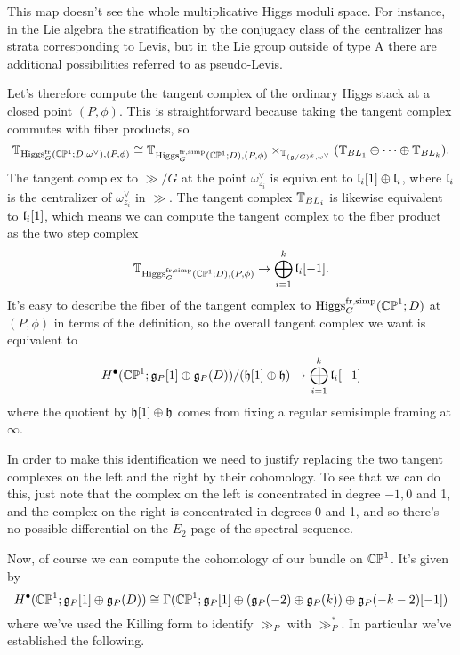 \documentclass[10pt, oneside]{article}
\begin{document}
\begin{remark}
This map doesn't see the whole multiplicative Higgs moduli space.  For instance, in the Lie algebra the stratification by the conjugacy class of the centralizer has strata corresponding to Levis, but in the Lie group outside of type A there are additional possibilities referred to as pseudo-Levis.  
\end{remark}

Let's therefore compute the tangent complex of the ordinary Higgs stack at a closed point $(P,\phi)$.  This is straightforward because taking the tangent complex commutes with fiber products, so
\[\mathbb{T}_{\mathrm{Higgs}_G^{\mathrm{fr}}(\mathbb{CP}^1; D, \omega^\vee),(P,\phi)} \cong \mathbb{T}_{\mathrm{Higgs}_G^\text{fr,simp}(\mathbb{CP}^1; D),(P,\phi)} \times_{\mathbb{T}_{(\mathfrak{g}/G)^k, \omega^\vee}} (\mathbb{T}_{BL_1} \oplus \cdots \oplus \mathbb{T}_{BL_k}).\]
The tangent complex to $\gg/G$ at the point $\omega^\vee_{z_i}$ is equivalent to $\mathfrak{l}_i[1] \oplus \mathfrak{l}_i$, where $\mathfrak{l}_i$ is the centralizer of $\omega^\vee_{z_i}$ in $\gg$.  The tangent complex $\mathbb{T}_{BL_i}$ is likewise equivalent to $\mathfrak{l}_i[1]$, which means we can compute the tangent complex to the fiber product as the two step complex
\[\mathbb{T}_{\mathrm{Higgs}_G^\text{fr,simp}(\mathbb{CP}^1; D),(P,\phi)} \to \bigoplus_{i=1}^k \mathfrak{l}_i[-1].\]
It's easy to describe the fiber of the tangent complex to $\mathrm{Higgs}_G^\text{fr,simp}(\mathbb{CP}^1; D)$ at $(P,\phi)$ in terms of the definition, so the overall tangent complex we want is equivalent to
\[H^\bullet(\mathbb{CP}^1; \mathfrak{g}_P[1] \oplus \mathfrak{g}_P(D))/(\mathfrak{h}[1] \oplus \mathfrak{h}) \to \bigoplus_{i=1}^k \mathfrak{l}_i[-1]\]
where the quotient by $\mathfrak{h}[1] \oplus \mathfrak{h}$ comes from fixing a regular semisimple framing at $\infty$.

\begin{remark}
In order to make this identification we need to justify replacing the two tangent complexes on the left and the right by their cohomology.  To see that we can do this, just note that the complex on the left is concentrated in degree $-1,0$ and 1, and the complex on the right is concentrated in degrees 0 and 1, and so there's no possible differential on the $E_2$-page of the spectral sequence.
\end{remark}

Now, of course we can compute the cohomology of our bundle on $\mathbb{CP}^1$.  It's given by 
\[H^\bullet(\mathbb{CP}^1; \mathfrak{g}_P[1] \oplus \mathfrak{g}_P(D)) \cong \Gamma(\mathbb{CP}^1; \mathfrak{g}_P[1] \oplus (\mathfrak{g}_P(-2) \oplus \mathfrak{g}_P(k)) \oplus \mathfrak{g}_P(-k-2)[-1])\]
where we've used the Killing form to identify $\gg_P$ with $\gg_P^*$.  In particular we've established the following.
\end{document}

